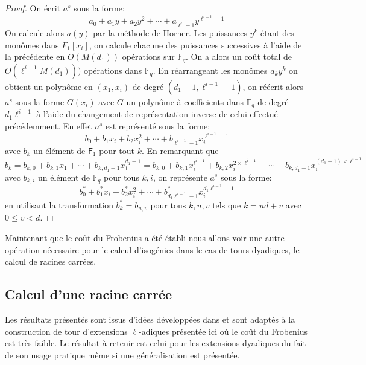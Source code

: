 \documentclass[10pt,a4paper]{book}
\theoremstyle{plain}
\theoremstyle{definition}
\theoremstyle{definition}
\theoremstyle{definition}
\theoremstyle{definition}
\theoremstyle{definition}
\theoremstyle{remark}
\theoremstyle{remark}
\theoremstyle{definition}
\begin{document}
\begin{proof}
On écrit $a^s$ sous la forme:
\begin{equation*}
a_0 + a_1 y + a_2 y^2 + \cdots + a_{\ell^i-1}y^{\ell^{i-1}-1}
\end{equation*}
On calcule alors $a(y)$ par la méthode de Horner. Les puissances $y^k$ étant des monômes dans $F_1[x_i]$, on calcule chacune des puissances successives à l'aide de la précédente en $O(M(d_1))$ opérations sur $\mathbb{F}_q$. On a alors un coût total de $O(\ell^{i-1}M(d_1)))$ opérations dans $\mathbb{F}_q$. En réarrangeant les monômes $a_k y^k$ on obtient un polynôme en $(x_1,x_i)$ de degré $(d_1-1,\ell^{i-1}-1)$, on réécrit alors $a^s$ sous la forme $G(x_i)$ avec $G$ un polynôme à coefficients dans $\mathbb{F}_q$ de degré $d_1\ell^{i-1}$  à l'aide du changement de représentation inverse de celui effectué précédemment. En effet $a^s$ est représenté sous la forme:
\begin{equation*}
b_0 + b_1 x_i + b_2 x_i^2 + \cdots + b_{\ell^{i-1}-1}x_i^{\ell^{i-1}-1}
\end{equation*}
avec $b_k$ un élément de $\mathsf{F}_1$ pour tout $k$. En remarquant que
\begin{equation*}
 b_k=b_{k,0} + b_{k,1}x_1 + \cdots + b_{k,d_1-1} x_1^{d_1-1}=b_{k,0} + b_{k,1}x_i^{\ell^{i-1}} + b_{k,2} x_i^{2 \times \ell^{i-1}} + \cdots + b_{k,d_1-1} x_i^{(d_1-1)\times \ell^{i-1}} 
\end{equation*}
 avec $b_{k,i}$ un élément de $\mathbb{F}_q$ pour tous $k,i$, on représente $a^s$ sous la forme:
\begin{equation*}
b_0^* + b_1^* x_i + b^*_2 x_i^2 + \cdots + b^*_{d_1\ell^{i-1}-1} x_i^{d_1\ell^{i-1}-1}
\end{equation*}
 en  utilisant la transformation $b_k^*=b_{u,v}$ pour tous $k,u,v$ tels que $k=ud+v$ avec $0 \leqslant v < d$.
\end{proof}

Maintenant que le coût du Frobenius a été établi nous allons voir une autre opération nécessaire pour le calcul d'isogénies dans le cas de tours dyadiques, le calcul de racines carrées.

\subsection*{Calcul d'une racine carrée}
Les résultats présentés sont issus d'idées développées dans \cite{Doliskani-Schost14} et sont adaptés à la construction de tour d'extensions $\ell$-adiques présentée ici où le coût du Frobenius est très faible. Le résultat à retenir est celui pour les extensions dyadiques du fait de son usage pratique même si une généralisation est présentée. 
\end{document}
